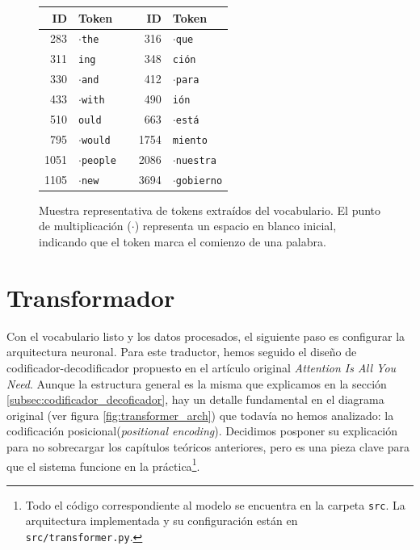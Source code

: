 \begin{figure}[t]
    \centering
    \begin{small}
    \begin{tabular}{rlp{0.5cm}rl}
    \toprule
    \textbf{ID} & \textbf{Token} & & \textbf{ID} & \textbf{Token} \\
    \midrule
    283 & \texttt{$\cdot$the} & & 316 & \texttt{$\cdot$que} \\
    311 & \texttt{ing} & & 348 & \texttt{ción} \\
    330 & \texttt{$\cdot$and} & & 412 & \texttt{$\cdot$para} \\
    433 & \texttt{$\cdot$with} & & 490 & \texttt{ión} \\
    510 & \texttt{ould} & & 663 & \texttt{$\cdot$está} \\
    795 & \texttt{$\cdot$would} & & 1754 & \texttt{miento} \\
    1051 & \texttt{$\cdot$people} & & 2086 & \texttt{$\cdot$nuestra} \\
    1105 & \texttt{$\cdot$new} & & 3694 & \texttt{$\cdot$gobierno} \\
    \bottomrule
    \end{tabular}
    \end{small}
    \caption{Muestra representativa de tokens extraídos del vocabulario. 
    El punto de multiplicación ($\cdot$) representa un espacio en blanco inicial, indicando que el token marca el comienzo de una palabra.
    }
    \label{fig:muestra_vocabulario}
\end{figure}

\section{Transformador}
Con el vocabulario listo y los datos procesados, el siguiente paso es configurar la arquitectura neuronal. Para este traductor, hemos 
seguido el diseño de codificador-decodificador propuesto en el artículo original \textit{Attention Is All You Need}. Aunque la estructura 
general es la misma que explicamos en la sección \ref{subsec:codificador_decoficador}, hay un detalle fundamental en el diagrama 
original (ver figura \ref{fig:transformer_arch}) que todavía no hemos analizado: la codificación posicional(\textit{positional encoding}). 
Decidimos posponer su explicación para no sobrecargar los capítulos teóricos anteriores, pero es una pieza clave para que el sistema funcione 
en la práctica\footnote{Todo el código correspondiente al modelo se encuentra en la carpeta \texttt{src}. 
La arquitectura implementada y su configuración están en \texttt{src/transformer.py}.}.

